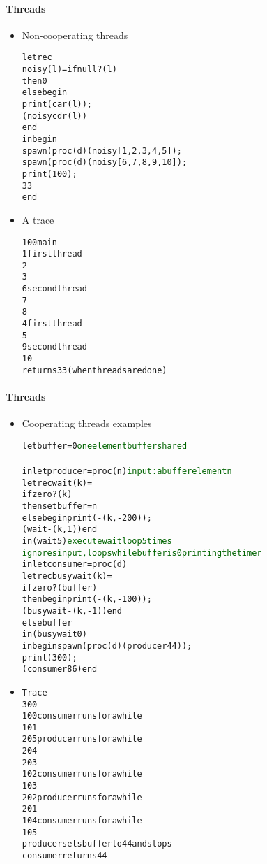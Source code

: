 \documentclass{beamer}
\begin{document}
\begin{frame}[fragile]
\framesubtitle{Threads}
\begin{scriptsize}
\begin{itemize}
\item<1-> Non-cooperating threads
\begin{alltt}
letrec
  noisy (l) = if null?(l)
              then 0
              else begin
                     print(car(l));
                     (noisy cdr(l))
                   end			
in begin
     spawn(proc (d) (noisy [1, 2, 3, 4, 5]);
     spawn(proc (d) (noisy [6, 7, 8, 9, 10]);
     print(100);
     33
   end
\end{alltt}

\item<2-> A trace
\begin{alltt}
100  main
1    first thread
2
3
6    second thread
7
8
4    first thread
5
9    second thread
10
returns 33  (when threads are done)
\end{alltt}

\end{itemize}
\end{scriptsize}
\end{frame}

\begin{frame}[fragile]
\framesubtitle{Threads}
\begin{tiny}
\begin{itemize}
\item<1-> Cooperating threads examples
\begin{alltt}
let buffer = 0 \textcolor{darkgreen}{one element buffer shared
}
in let producer = proc (n) \textcolor{darkgreen}{input: a buffer element n}
                    letrec wait(k) = 
                      if zero?(k)
                      then set buffer = n
                      else begin print(-(k,-200));
                                 (wait -(k,1)) end
                    in (wait 5) \textcolor{darkgreen}{execute wait loop 5 times}
        \textcolor{darkgreen}{ignores input, loops while buffer is 0 printing the timer}
   in let consumer = proc (d) 
                      letrec busywait (k) = 
                        if zero?(buffer)
                        then begin print(-(k,-100));
                                   (busywait -(k,-1)) end
                        else buffer
                      in (busywait 0)
      in begin spawn(proc (d) (producer 44));
               print(300);
               (consumer 86) end
\end{alltt}

\item<2->
\begin{alltt}
Trace
300
100    consumer runs for a while
101
205    producer runs for a while
204
203
102    consumer runs for a while
103
202    producer runs for a while
201
104    consumer runs for a while
105
producer sets buffer to 44 and stops
consumer returns 44
\end{alltt}

\end{itemize}
\end{tiny}
\end{frame}
\end{document}
